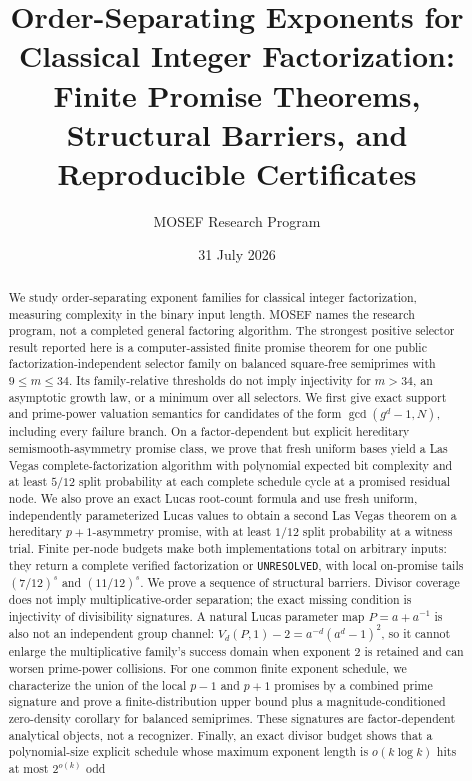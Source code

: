 \documentclass[11pt]{article}
\title{Order-Separating Exponents for Classical Integer Factorization:\\
Finite Promise Theorems, Structural Barriers, and Reproducible Certificates}
\author{MOSEF Research Program}
\date{31 July 2026}
\begin{document}
\maketitle

\begin{abstract}
We study order-separating exponent families for classical integer
factorization, measuring complexity in the binary input length. MOSEF names
the research program, not a completed general factoring algorithm. The
strongest positive selector result reported here is a computer-assisted
finite promise theorem for one public factorization-independent selector
family on balanced square-free semiprimes with \(9\le m\le34\). Its
family-relative thresholds do not imply injectivity for \(m>34\), an
asymptotic growth law, or a minimum over all selectors. We first give exact
support and prime-power valuation semantics for candidates of the form
\(\gcd(g^d-1,N)\), including every failure branch. On a factor-dependent but
explicit hereditary semismooth-asymmetry promise class, we prove that fresh
uniform bases yield a Las Vegas complete-factorization algorithm with
polynomial expected bit complexity and at least \(5/12\) split probability at
each complete schedule cycle at a promised residual node. We also prove an
exact Lucas root-count formula and use fresh uniform, independently
parameterized Lucas values to obtain a second Las Vegas theorem on a
hereditary \(p+1\)-asymmetry promise, with at least \(1/12\) split probability
at a witness trial. Finite per-node budgets make both implementations total
on arbitrary inputs: they return a complete verified factorization or
\texttt{UNRESOLVED}, with local on-promise tails \((7/12)^s\) and
\((11/12)^s\). We prove a sequence of structural barriers. Divisor
coverage does not imply multiplicative-order separation; the exact missing
condition is injectivity of divisibility signatures. A natural Lucas
parameter map \(P=a+a^{-1}\) is also not an independent group channel:
\(V_d(P,1)-2=a^{-d}(a^d-1)^2\), so it cannot enlarge the multiplicative
family's success domain when exponent \(2\) is retained and can worsen
prime-power collisions. For one common finite exponent schedule, we
characterize the union of the local \(p-1\) and \(p+1\) promises by a combined
prime signature and prove a finite-distribution upper bound plus a
magnitude-conditioned zero-density corollary for balanced semiprimes. These
signatures are factor-dependent analytical objects, not a recognizer. Finally,
an exact divisor budget shows that a polynomial-size explicit schedule whose
maximum exponent length is \(o(k\log k)\) hits at most \(2^{o(k)}\) odd

\end{abstract}
\end{document}
